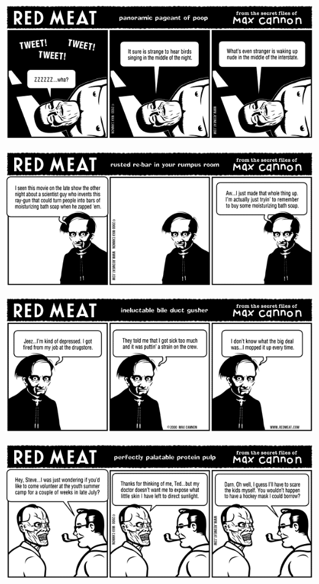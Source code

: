 \documentclass[a4paper,twoside,11pt]{article}
\begin{document}
\includegraphics[width=\textwidth]{redmeat_2000-08-01.png}



\includegraphics[width=\textwidth]{redmeat_2000-08-08.png}



\includegraphics[width=\textwidth]{redmeat_2000-08-15.png}



\includegraphics[width=\textwidth]{redmeat_2000-08-22.png}
\end{document}

